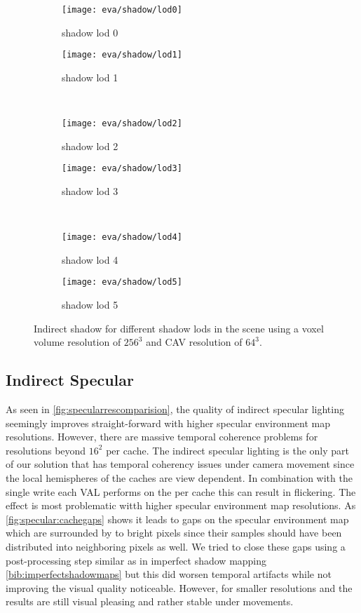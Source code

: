 \documentclass[thesis.tex]{subfiles}
\begin{document}
\begin{figure}
\begin{subfigure}[b]{\halfpageimage}
\texttt{[image: eva/shadow/lod0]}
\caption{shadow lod 0}
\end{subfigure}
\begin{subfigure}[b]{\halfpageimage}
\texttt{[image: eva/shadow/lod1]}
\caption{shadow lod 1}
\end{subfigure}
\\
\begin{subfigure}[b]{\halfpageimage}
\texttt{[image: eva/shadow/lod2]}
\caption{shadow lod 2}
\end{subfigure}
\begin{subfigure}[b]{\halfpageimage}
\texttt{[image: eva/shadow/lod3]}
\caption{shadow lod 3}
\end{subfigure}
\\
\begin{subfigure}[b]{\halfpageimage}
\texttt{[image: eva/shadow/lod4]}
\caption{shadow lod 4}
\end{subfigure}
\begin{subfigure}[b]{\halfpageimage}
\texttt{[image: eva/shadow/lod5]}
\caption{shadow lod 5}
\end{subfigure}
\caption{Indirect shadow for different shadow lods in the  scene using a voxel volume resolution of $256^3$ and CAV resolution of $64^3$. }
\label{fig:shadowcomparision:lod}
\end{figure}


\subsection{Indirect Specular}
As seen in \autoref{fig:specularrescomparision}, the quality of indirect specular lighting seemingly improves straight-forward with higher specular environment map resolutions.
However, there are massive temporal coherence problems for resolutions beyond $16^2$ per cache.
The indirect specular lighting is the only part of our solution that has temporal coherency issues under camera movement since the local hemispheres of the caches are view dependent.
In combination with the single write each VAL performs on the per cache this can result in flickering.
The effect is most problematic witth higher specular environment map resolutions.
As \autoref{fig:specular:cachegaps} shows it leads to gaps on the specular environment map which are surrounded by to bright pixels since their samples should have been distributed into neighboring pixels as well.
We tried to close these gaps using a post-processing step similar as in imperfect shadow mapping \autoref{bib:imperfectshadowmaps} but this did worsen temporal artifacts while not improving the visual quality noticeable.
However, for smaller resolutions and  the results are still visual pleasing and rather stable under movements.
\end{document}
